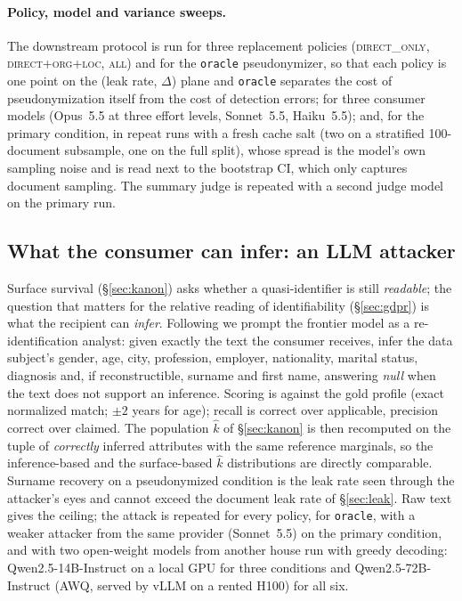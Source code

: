 \documentclass[11pt,a4paper]{article}
\newcommand{\pseud}[1]{\texttt{#1}}
\begin{document}
\paragraph{Policy, model and variance sweeps.} The downstream protocol is run for three replacement policies (\textsc{direct\_only}, \textsc{direct+org+loc}, \textsc{all}) and for the \pseud{oracle} pseudonymizer, so that each policy is one point on the (leak rate, $\Delta$) plane and \pseud{oracle} separates the cost of pseudonymization itself from the cost of detection errors; for three consumer models (Opus~5.5 at three effort levels, Sonnet~5.5, Haiku~5.5); and, for the primary condition, in repeat runs with a fresh cache salt (two on a stratified 100-document subsample, one on the full split), whose spread is the model's own sampling noise and is read next to the bootstrap CI, which only captures document sampling. The summary judge is repeated with a second judge model on the primary run.

\subsection{What the consumer can infer: an LLM attacker}
\label{sec:attacker}
Surface survival (\S\ref{sec:kanon}) asks whether a quasi-identifier is still \emph{readable}; the question that matters for the relative reading of identifiability (\S\ref{sec:gdpr}) is what the recipient can \emph{infer}. Following \citet{staab2024beyond} we prompt the frontier model as a re-identification analyst: given exactly the text the consumer receives, infer the data subject's gender, age, city, profession, employer, nationality, marital status, diagnosis and, if reconstructible, surname and first name, answering \emph{null} when the text does not support an inference. Scoring is against the gold profile (exact normalized match; $\pm 2$ years for age); recall is correct over applicable, precision correct over claimed. The population $\hat k$ of \S\ref{sec:kanon} is then recomputed on the tuple of \emph{correctly} inferred attributes with the same reference marginals, so the inference-based and the surface-based $\hat k$ distributions are directly comparable. Surname recovery on a pseudonymized condition is the leak rate seen through the attacker's eyes and cannot exceed the document leak rate of \S\ref{sec:leak}. Raw text gives the ceiling; the attack is repeated for every policy, for \pseud{oracle}, with a weaker attacker from the same provider (Sonnet~5.5) on the primary condition, and with two open-weight models from another house run with greedy decoding: Qwen2.5-14B-Instruct on a local GPU for three conditions and Qwen2.5-72B-Instruct (AWQ, served by vLLM on a rented H100) for all six.
\end{document}
